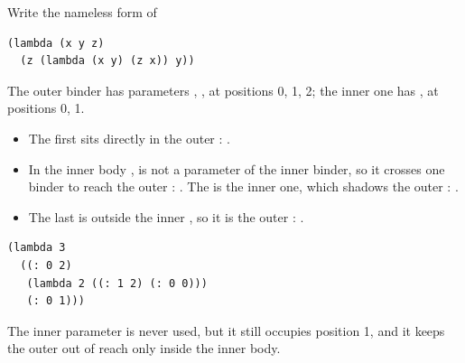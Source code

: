 \begin{exercise}
Write the nameless form of
\begin{lstlisting}
(lambda (x y z)
  (z (lambda (x y) (z x)) y))
\end{lstlisting}
\end{exercise}
\begin{solution}
The outer binder has parameters , ,  at positions 0, 1, 2; the inner one has ,  at positions 0, 1.
\begin{itemize}
  \item The first  sits directly in the outer : .
  \item In the inner body ,  is not a parameter of the inner binder, so it crosses one binder to reach the outer : . The  is the inner one, which shadows the outer : .
  \item The last  is outside the inner , so it is the outer : .
\end{itemize}
\begin{lstlisting}
(lambda 3
  ((: 0 2)
   (lambda 2 ((: 1 2) (: 0 0)))
   (: 0 1)))
\end{lstlisting}
The inner parameter  is never used, but it still occupies position 1, and it keeps the outer  out of reach only inside the inner body.
\end{solution}
